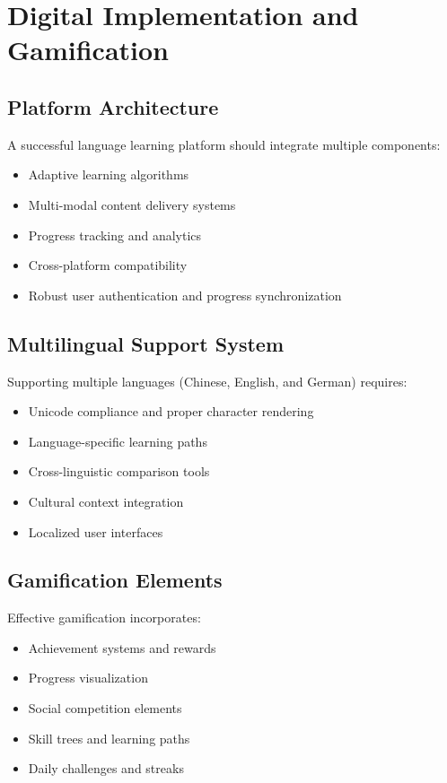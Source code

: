 \section{Digital Implementation and Gamification}
\subsection{Platform Architecture}
A successful language learning platform should integrate multiple components:
\begin{itemize}
    \item Adaptive learning algorithms
    \item Multi-modal content delivery systems
    \item Progress tracking and analytics
    \item Cross-platform compatibility
    \item Robust user authentication and progress synchronization
\end{itemize}

\subsection{Multilingual Support System}
Supporting multiple languages (Chinese, English, and German) requires:
\begin{itemize}
    \item Unicode compliance and proper character rendering
    \item Language-specific learning paths
    \item Cross-linguistic comparison tools
    \item Cultural context integration
    \item Localized user interfaces
\end{itemize}

\subsection{Gamification Elements}
Effective gamification \citep{godwin2016gamification} incorporates:
\begin{itemize}
    \item Achievement systems and rewards
    \item Progress visualization
    \item Social competition elements
    \item Skill trees and learning paths
    \item Daily challenges and streaks
\end{itemize}

